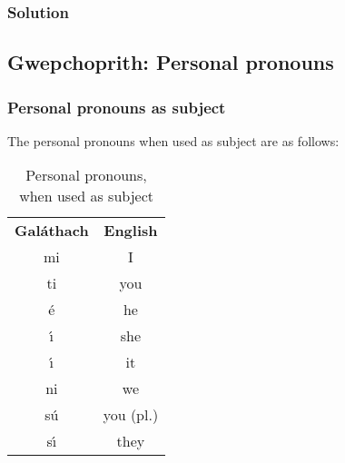 \subsubsection{Solution}
\begin{table}[H]
\centering
{}
\label{solution_present_tense}
\caption{Solution: present tense}
\end{table}
\newpage

\subsection{Gwepchoprith: Personal pronouns}

\subsubsection{Personal pronouns as subject}

The personal pronouns when used as subject are as follows:
\begin{table}[H]
\centering
\begin{tabular}{cc}
  \toprule
  \textbf{Gal\'{a}thach} & \textbf{English}\\
  \cmidrule(lr){1-1}\cmidrule{2-2}
  mi & I \\
  ti & you\\
  \'{e} & he\\
  \'{\i} & she\\
  \'{\i} & it\\
  ni & we\\
  s\'{u} & you (pl.)\\
  s\'{\i} & they\\
  \bottomrule
\end{tabular}
\caption{Personal pronouns, when used as subject}
\label{personal_pronouns_as_subject}
\end{table}


